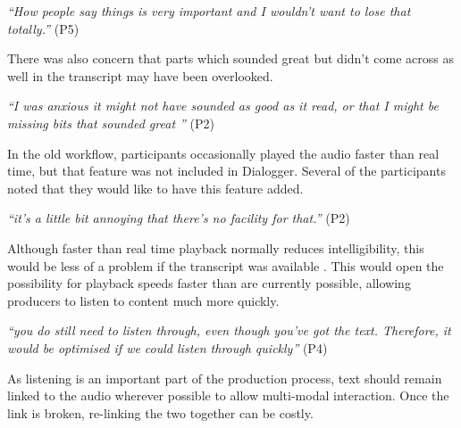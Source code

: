 \textit{``How people say things is very important and I wouldn't want to lose that totally.''} (P5)

There was also concern that parts which sounded great but didn't come across as well in the transcript may have been
overlooked.

\textit{``I was anxious it might not have sounded as good as it read, or that I might be missing bits that sounded
  great ''} (P2)

In the old workflow, participants occasionally played the audio faster than real time, but that feature was not
included in Dialogger.  Several of the participants noted that they would like to have this feature added.

\textit{``it's a little bit annoying that there's no facility for that.''} (P2)

Although faster than real time playback normally reduces intelligibility, this would be less of a problem if the
transcript was available \citep{Ranjan2006}.  This would open the possibility for playback speeds faster than are
currently possible, allowing producers to listen to content much more quickly.

\textit{``you do still need to listen through, even though you've got the text.  Therefore, it would be optimised if we
  could listen through quickly''} (P4)

As listening is an important part of the production process, text should remain linked to the audio wherever possible
to allow multi-modal interaction. Once the link is broken, re-linking the two together can be costly.




